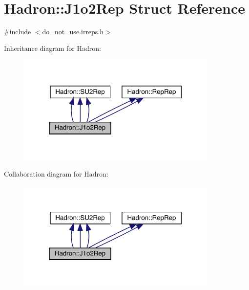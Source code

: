 \hypertarget{structHadron_1_1J1o2Rep}{}\section{Hadron\+:\+:J1o2\+Rep Struct Reference}
\label{structHadron_1_1J1o2Rep}


{\ttfamily \#include $<$do\+\_\+not\+\_\+use.\+irreps.\+h$>$}



Inheritance diagram for Hadron\+:
\nopagebreak
\begin{figure}[H]
\begin{center}
\leavevmode
\includegraphics[width=283pt]{df/d3d/structHadron_1_1J1o2Rep__inherit__graph}
\end{center}
\end{figure}


Collaboration diagram for Hadron\+:
\nopagebreak
\begin{figure}[H]
\begin{center}
\leavevmode
\includegraphics[width=283pt]{df/daa/structHadron_1_1J1o2Rep__coll__graph}
\end{center}
\end{figure}
